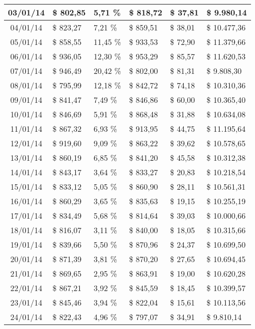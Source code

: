 \begin{small}
\begin{longtable}{|c|l|l|l|l|l|}
03/01/14 & \$ 802,85 & 5,71 \% & \$ 818,72 & \$ 37,81 & \$ 9.980,14 \\ \hline
04/01/14 & \$ 823,27 & 7,21 \% & \$ 859,51 & \$ 38,01 & \$ 10.477,36 \\ \hline
05/01/14 & \$ 858,55 & 11,45 \% & \$ 933,53 & \$ 72,90 & \$ 11.379,66 \\ \hline
06/01/14 & \$ 936,05 & 12,30 \% & \$ 953,29 & \$ 85,57 & \$ 11.620,53 \\ \hline
07/01/14 & \$ 946,49 & 20,42 \% & \$ 802,00 & \$ 81,31 & \$ 9.808,30 \\ \hline
08/01/14 & \$ 795,99 & 12,18 \% & \$ 842,72 & \$ 74,18 & \$ 10.310,36 \\ \hline
09/01/14 & \$ 841,47 & 7,49 \% & \$ 846,86 & \$ 60,00 & \$ 10.365,40 \\ \hline
10/01/14 & \$ 846,69 & 5,91 \% & \$ 868,48 & \$ 31,88 & \$ 10.634,08 \\ \hline
11/01/14 & \$ 867,32 & 6,93 \% & \$ 913,95 & \$ 44,75 & \$ 11.195,64 \\ \hline
12/01/14 & \$ 919,60 & 9,09 \% & \$ 863,22 & \$ 39,62 & \$ 10.578,65 \\ \hline
13/01/14 & \$ 860,19 & 6,85 \% & \$ 841,20 & \$ 45,58 & \$ 10.312,38 \\ \hline
14/01/14 & \$ 843,17 & 3,64 \% & \$ 833,27 & \$ 20,83 & \$ 10.218,54 \\ \hline
15/01/14 & \$ 833,12 & 5,05 \% & \$ 860,90 & \$ 28,11 & \$ 10.561,31 \\ \hline
16/01/14 & \$ 860,29 & 3,65 \% & \$ 835,63 & \$ 19,15 & \$ 10.255,19 \\ \hline
17/01/14 & \$ 834,49 & 5,68 \% & \$ 814,64 & \$ 39,03 & \$ 10.000,66 \\ \hline
18/01/14 & \$ 816,07 & 3,11 \% & \$ 840,00 & \$ 18,05 & \$ 10.315,66 \\ \hline
19/01/14 & \$ 839,66 & 5,50 \% & \$ 870,96 & \$ 24,37 & \$ 10.699,50 \\ \hline
20/01/14 & \$ 871,39 & 3,81 \% & \$ 870,20 & \$ 27,65 & \$ 10.694,45 \\ \hline
21/01/14 & \$ 869,65 & 2,95 \% & \$ 863,91 & \$ 19,00 & \$ 10.620,28 \\ \hline
22/01/14 & \$ 867,21 & 3,92 \% & \$ 845,59 & \$ 18,45 & \$ 10.399,57 \\ \hline
23/01/14 & \$ 845,46 & 3,94 \% & \$ 822,04 & \$ 15,61 & \$ 10.113,56 \\ \hline
24/01/14 & \$ 822,43 & 4,96 \% & \$ 797,07 & \$ 34,91 & \$ 9.810,14 \\ \hline

\end{longtable}
\end{small}
